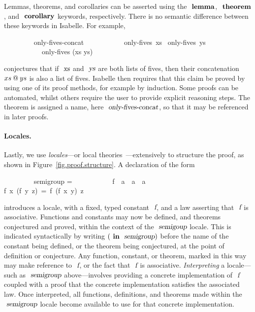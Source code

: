 Lemmas, theorems, and corollaries can be asserted using the $\isacommand{lemma}$, $\isacommand{theorem}$, and $\isacommand{corollary}$ keywords, respectively.
There is no semantic difference between these keywords in Isabelle.
For example,
\vspace{0.35em}
\begin{isabellebody}
\ \ \ \ \ \ \ \  only-fives-concat{\isacharcolon}\isanewline
\ \ \ \ \ \ \ \ \ \ \ only-fives\ xs \ only-fives\ ys \isanewline
\ \ \ \ \ \ \ \ \ \ \ only-fives (xs \isacharat ys)
\end{isabellebody}
\vspace{0.35em}
\noindent
conjectures that if $\isa{xs}$ and $\isa{ys}$ are both lists of fives, then their concatenation $xs \mathbin{\emph{$@$}} ys$ is also a list of fives.
Isabelle then requires that this claim be proved by using one of its proof methods, for example by induction.
Some proofs can be automated, whilst others require the user to provide explicit reasoning steps.
The theorem is assigned a name, here $\isa{only-fives-concat}$, so that it may be referenced in later proofs.

\paragraph{Locales.}

Lastly, we use \emph{locales}---or local theories~\cite{DBLP:conf/tphol/KammullerWP99,DBLP:conf/types/HaftmannW08}---extensively to structure the proof, as shown in Figure~\ref{fig.proof.structure}.
A declaration of the form
\vspace{0.35em}
\begin{isabellebody}
\ \ \ \ \ \ \ \  semigroup = \isanewline
\ \ \ \ \ \ \ \ \ \ \ f\ {\isacharcolon}{\isacharcolon}\ {\isachardoublequoteopen}{\isacharprime}a\ {\isasymRightarrow}\ {\isacharprime}a{\isachardoublequoteclose}\ {\isasymRightarrow}\ {\isacharprime}a{\isachardoublequoteclose} \isanewline
\ \ \ \ \ \ \ \ \ \  {\isachardoublequoteopen}f\ x\ (f\ y\ z)\ =\ f\ (f\ x\ y)\ z{\isachardoublequoteclose}
\end{isabellebody}
\vspace{0.35em}
\noindent
introduces a locale, with a fixed, typed constant $\isa{f}$, and a law asserting that $\isa{f}$ is associative.
Functions and constants may now be defined, and theorems conjectured and proved, within the context of the $\isa{semigoup}$ locale.
This is indicated syntactically by writing $(\isacommand{in}\ \isa{semigroup})$ before the name of the constant being defined, or the theorem being conjectured, at the point of definition or conjecture.
Any function, constant, or theorem, marked in this way may make reference to $\isa{f}$, or the fact that $\isa{f}$ is associative.
\emph{Interpreting} a locale---such as $\isa{semigroup}$ above---involves providing a concrete implementation of $\isa{f}$ coupled with a proof that the concrete implementation satisfies the associated law.
Once interpreted, all functions, definitions, and theorems made within the $\isa{semigroup}$ locale become available to use for that concrete implementation.
